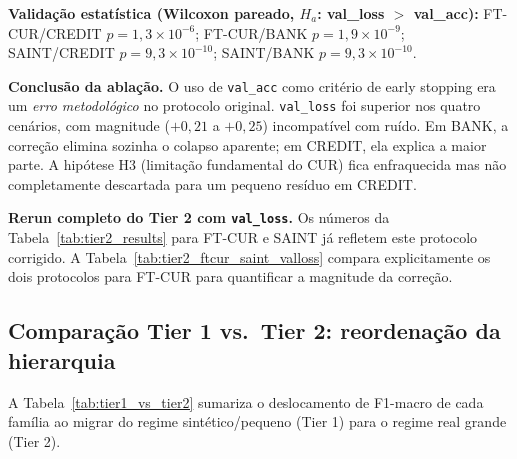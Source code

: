 \documentclass[12pt,a4paper]{article}
\begin{document}
\textbf{Validação estatística (Wilcoxon pareado, $H_a$: val\_loss $>$ val\_acc):}
FT-CUR/CREDIT $p = 1{,}3 \times 10^{-6}$;
FT-CUR/BANK   $p = 1{,}9 \times 10^{-9}$;
SAINT/CREDIT  $p = 9{,}3 \times 10^{-10}$;
SAINT/BANK    $p = 9{,}3 \times 10^{-10}$.

\textbf{Conclusão da ablação.} O uso de \texttt{val\_acc} como critério de
early stopping era um \emph{erro metodológico} no protocolo original.
\texttt{val\_loss} foi superior nos quatro cenários, com magnitude
($+0{,}21$ a $+0{,}25$) incompatível com ruído. Em BANK, a correção elimina
sozinha o colapso aparente; em CREDIT, ela explica a maior parte. A
hipótese H3 (limitação fundamental do CUR) fica enfraquecida mas não
completamente descartada para um pequeno resíduo em CREDIT.

\textbf{Rerun completo do Tier 2 com \texttt{val\_loss}.} Os números da
Tabela~\ref{tab:tier2_results} para FT-CUR e SAINT já refletem este protocolo
corrigido. A Tabela~\ref{tab:tier2_ftcur_saint_valloss} compara explicitamente
os dois protocolos para FT-CUR para quantificar a magnitude da correção.

\begin{table}[H]
\centering
\caption{FT-CUR no Tier 2: protocolo histórico (\texttt{val\_acc}) vs.\
protocolo corrigido (\texttt{val\_loss}).}
\label{tab:tier2_ftcur_saint_valloss}
\end{table}

\subsection{Comparação Tier 1 vs.\ Tier 2: reordenação da hierarquia}
\label{sec:tier1_vs_tier2}

A Tabela~\ref{tab:tier1_vs_tier2} sumariza o deslocamento de F1-macro de
cada família ao migrar do regime sintético/pequeno (Tier 1) para o regime
real grande (Tier 2).
\end{document}
